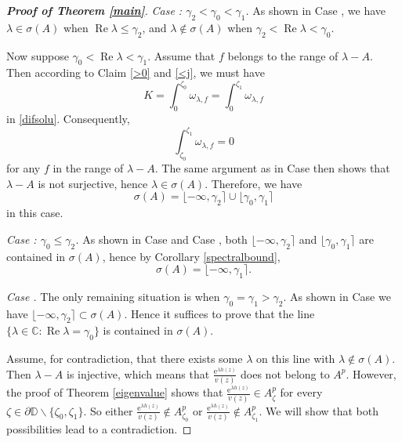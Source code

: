 \documentclass{amsart}
\theoremstyle{proclaim}
\theoremstyle{fancyproclaim}
\theoremstyle{definition}
\theoremstyle{fancystatement}
\numberwithin{equation}{section}
\begin{document}
\begin{proof}[\textbf{Proof of Theorem \ref{main}}]
\noindent\emph{ Case \uppercase\expandafter{}: $\gamma_2<\gamma_0<\gamma_1$.} As shown in Case \uppercase\expandafter{}, we have $\lambda\in\sigma(A)$ when $\operatorname{Re}\lambda\leq\gamma_2$, and $\lambda\notin\sigma(A)$ when $\gamma_2<\operatorname{Re}\lambda<\gamma_0$.

Now suppose $\gamma_0<\operatorname{Re}\lambda<\gamma_1$. Assume that $f$ belongs to the range of $\lambda-A$. Then according to Claim \ref{>0} and \ref{<j}, we must have
$$K=\int_0^{\zeta_0} \omega_{\lambda,f}=\int_0^{\zeta_1} \omega_{\lambda,f}$$
in \eqref{difsolu}. Consequently,
$$\int_{\zeta_0}^{\zeta_1} \omega_{\lambda,f}=0$$
for any $f$ in the range of $\lambda-A$. The same argument as in Case \uppercase\expandafter{} then shows that $\lambda-A$ is not surjective, hence $\lambda\in\sigma(A)$. Therefore, we have 
$$\sigma(A)=\lfloor-\infty, \gamma_2\rceil\cup\lfloor\gamma_0, \gamma_1\rceil$$
in this case.

 


\noindent\emph{ Case \uppercase\expandafter{}: $\gamma_0\leq\gamma_2$.} As shown in Case \uppercase\expandafter{}  and Case \uppercase\expandafter{} , both $\lfloor-\infty,\gamma_2\rceil$ and $\lfloor\gamma_0,\gamma_1\rceil$ are contained in $\sigma(A)$, hence by Corollary \ref{spectralbound}, 
$$\sigma(A)=\lfloor-\infty,\gamma_1\rceil.$$



\noindent\emph{ Case \uppercase\expandafter{}.} The only remaining situation is when $\gamma_0=\gamma_1>\gamma_2$. As shown in Case \uppercase\expandafter{} we have $\lfloor-\infty,\gamma_2\rceil\subset\sigma(A)$. Hence it suffices to prove that the line $\{\lambda\in\mathbb{C} : \operatorname{Re}\lambda=\gamma_0 \}$ is contained in $\sigma(A)$. 

Assume, for contradiction, that there exists some $\lambda$ on this line with $\lambda\notin\sigma(A)$. Then $\lambda-A$ is injective, which means that $\frac{\mathrm{e}^{\lambda h(z)}}{v(z)}$ does not belong to $A^p$. However, the proof of Theorem \ref{eigenvalue} shows that $\frac{\mathrm{e}^{\lambda h(z)}}{v(z)}\in A^p_\zeta$ for every $\zeta\in \partial \mathbb{D}\backslash\{\zeta_0, \zeta_1\}$. So either  $\frac{\mathrm{e}^{\lambda h(z)}}{v(z)}\notin A^p_{\zeta_0}$ or $\frac{\mathrm{e}^{\lambda h(z)}}{v(z)}\notin A^p_{\zeta_1}$. We will show that both possibilities lead to a contradiction.


\end{proof}
\end{document}
